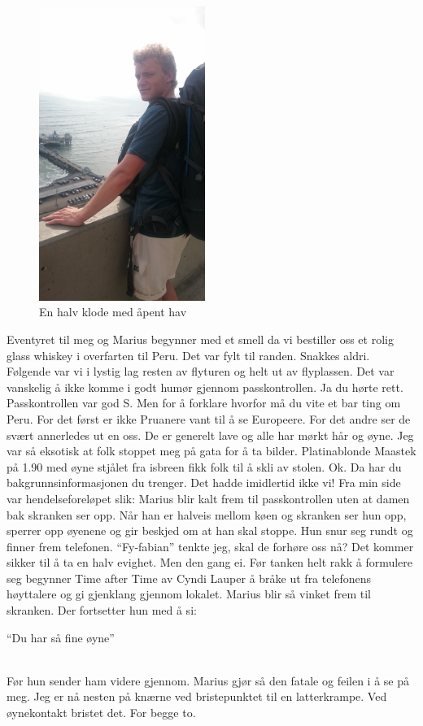 \begin{figure}
	\begin{center}
		\includegraphics[width=0.48\textwidth]{stllehavet}
	\end{center}
	\caption{En halv klode med åpent hav}
\end{figure}
Eventyret til meg og Marius begynner med et smell da vi bestiller oss
et
rolig glass whiskey i overfarten til Peru. Det var fylt til
randen. Snakkes aldri.
Følgende var vi i lystig lag resten av flyturen og helt ut av
flyplassen. Det var vanskelig å ikke komme i godt humør gjennom
passkontrollen. Ja du hørte rett. Passkontrollen var god S. Men for å
forklare hvorfor må du vite et bar ting om Peru. For det først er ikke
Pruanere vant
til å se Europeere. For det andre ser de svært annerledes ut en oss.
De er generelt lave og alle har mørkt hår og øyne. Jeg
var så eksotisk at folk stoppet meg på gata for å ta bilder.
Platinablonde Maastek på 1.90 med øyne stjålet fra isbreen fikk folk
til å skli av stolen. Ok. Da har du bakgrunnsinformasjonen du
trenger. Det hadde imidlertid ikke vi! Fra min side var hendelseforeløpet slik: Marius
blir kalt frem til passkontrollen uten at damen bak skranken ser opp.
Når han er halveis mellom køen og skranken ser hun opp, sperrer opp
øyenene og gir beskjed om at han skal stoppe. Hun snur seg rundt
og finner frem telefonen. ``Fy-fabian'' tenkte jeg, skal de forhøre oss
nå? Det kommer sikker til å ta en halv evighet. Men den gang ei. Før
tanken helt rakk å formulere seg begynner Time after Time av Cyndi
Lauper å bråke ut fra telefonens høyttalere og gi gjenklang gjennom
lokalet. Marius blir så vinket frem til skranken. Der fortsetter hun
med å si:\\
\begin{dialogue}
	\item ``Du har så fine øyne'' 
\end{dialogue}\\
Før hun sender ham videre
gjennom. Marius gjør så den fatale og feilen i å se på meg. Jeg er nå
nesten på knærne ved bristepunktet til en latterkrampe. Ved øynekontakt
bristet det. For begge to. \\

